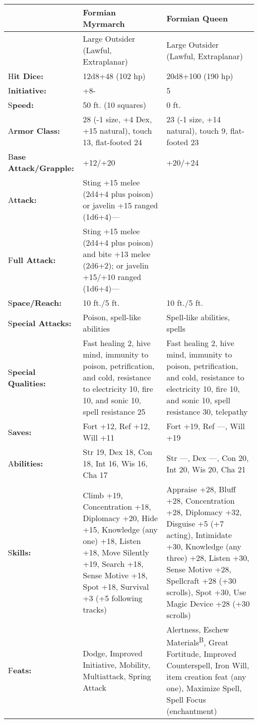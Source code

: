 \documentclass{article}
\begin{document}
\vspace{12pt}
\begin{tabular}{|>{\raggedright}p{49pt}|>{\raggedright}p{132pt}|>{\raggedright}p{132pt}|}
\hline
  & F\textbf{ormian Myrmarch} & F\textbf{ormian Queen}\tabularnewline
\hline
  & Large Outsider {\small{}(Lawful, Extraplanar)} & Large Outsider {\small{}(Lawful, 
Extraplanar)}\tabularnewline
\hline
H\textbf{it Dice:} & 12d8+48 (102 hp) & 20d8+100 (190 hp)\tabularnewline
\hline
I\textbf{nitiative:} & +8- & 5\tabularnewline
\hline
S\textbf{peed:} & 50 ft. (10 squares) & 0 ft.\tabularnewline
\hline
A\textbf{rmor Class:} & 28 (-1 size, +4 Dex, +15 natural), touch 13, flat-footed 
24 & 23 (-1 size, +14 natural), touch 9, flat-footed 23\tabularnewline
\hline
B\textbf{ase Attack/Grapple:} & +12/+20 & +20/+24\tabularnewline
\hline
A\textbf{ttack:} & Sting +15 melee (2d4+4 plus poison) or javelin +15 ranged (1d6+4)--- & \tabularnewline
\hline
F\textbf{ull Attack:} & Sting +15 melee (2d4+4 plus poison) and bite +13 melee 
(2d6+2); or javelin +15/+10 ranged (1d6+4)--- & \tabularnewline
\hline
S\textbf{pace/Reach:} & 10 ft./5 ft. & 10 ft./5 ft.\tabularnewline
\hline
S\textbf{pecial Attacks:} & Poison, spell-like abilities & Spell-like abilities, 
spells\tabularnewline
\hline
S\textbf{pecial Qualities:} & Fast healing 2, hive mind, immunity to poison, petrification, 
and cold, resistance to electricity 10, fire 10, and sonic 10, spell resistance 
25 & Fast healing 2, hive mind, immunity to poison, petrification, and cold, resistance 
to electricity 10, fire 10, and sonic 10, spell resistance 30, telepathy\tabularnewline
\hline
S\textbf{aves:} & Fort +12, Ref +12, Will +11 & Fort +19, Ref ---, Will +19\tabularnewline
\hline
A\textbf{bilities:} & Str 19, Dex 18, Con 18, Int 16, Wis 16, Cha 17 & Str ---, 
Dex ---, Con 20, Int 20, Wis 20, Cha 21\tabularnewline
\hline
S\textbf{kills:} & Climb +19, Concentration +18, Diplomacy +20, Hide +15, Knowledge 
(any one) +18, Listen +18, Move Silently +19, Search +18, Sense Motive +18, Spot 
+18, Survival +3 (+5 following tracks) & Appraise +28, Bluff +28, Concentration 
+28, Diplomacy +32, Disguise +5 (+7 acting), Intimidate +30, Knowledge (any three) 
+28, Listen +30, Sense Motive +28, Spellcraft +28 (+30 scrolls), Spot +30, Use 
Magic Device +28 (+30 scrolls)\tabularnewline
\hline
F\textbf{eats:} & Dodge, Improved Initiative, Mobility, Multiattack, Spring Attack & Alertness, 
Eschew Materials\textsuperscript{B}, Great Fortitude, Improved Counterspell, Iron 
Will, item creation feat (any one), Maximize Spell, Spell Focus (enchantment)\tabularnewline

\end{tabular}
\end{document}
